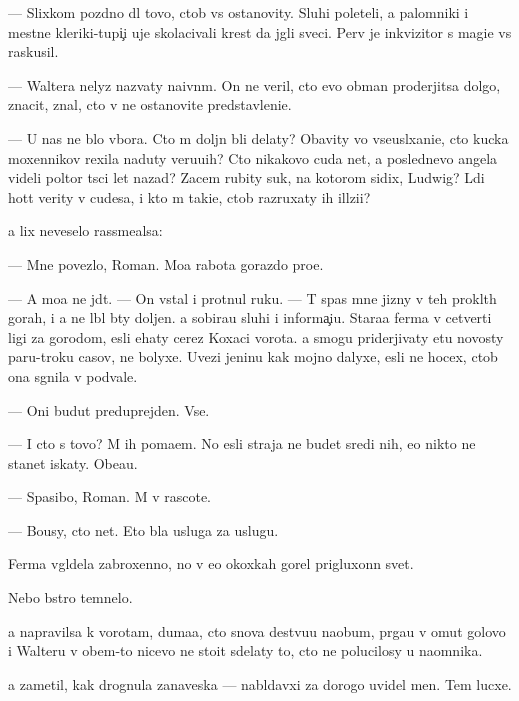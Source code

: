 \documentclass[10pt]{book}
\begin{document}
— Slixkom pozdno dl{\ia} tovo, ctob{\yi} vs{\e} ostanovity. Sluhi poleteli, a palomniki i mestn{\yi}{\y}e kleriki-tupi{\c}i uje skolacivali krest da jgli sveci. Perv{\yi}{\y} je inkvizitor s magi{\y}e{\y} vs{\e} raskusil.

— Waltera nelyz{\ia} nazvaty naivn{\yi}m. On ne veril, cto {\y}evo obman proderjitsa dolgo, znacit, znal, cto v{\yi} ne ostanovite predstavleni{\y}e.

— U nas ne b{\yi}lo v{\yi}bora. Cto m{\yi} doljn{\yi} b{\yi}li delaty? Ob{\y}avity vo vse\-usl{\yi}\-xa\-ni\-{\y}e, cto kucka moxennikov rexila naduty veru{\y}u{\x}ih? Cto nikakovo cuda net, a poslednevo angela videli poltor{\yi} t{\yi}s{\ia}ci let nazad? Zacem rubity suk, na kotorom sidix, Ludwig? L{\io}di hot{\ia}t verity v cudesa, i kto m{\yi} taki{\y}e, ctob{\yi} razruxaty ih ill{\io}zi{\y}i?

{\Y}a lix neveselo rassme{\y}alsa:

— Mne povezlo, Roman. Mo{\y}a rabota gorazdo pro{\x}e.

— A mo{\y}a ne jd{\e}t. — On vstal i pro\-t{\ia}\-nul ruku. — T{\yi} spas mne jizny v teh pro\-kl{\ia}\-t{\yi}h gorah, i {\y}a ne l{\io}bl{\io} b{\yi}ty doljen. {\Y}a sobira{\y}u sluhi i informa{\c}i{\y}u. Stara{\y}a ferma v cetverti ligi za gorodom, {\y}esli {\y}ehaty cerez Koxac{\y}i vorota. {\Y}a smogu priderjivaty etu novosty paru-tro{\y}ku casov, ne bolyxe. Uvezi jen{\x}inu kak mojno dalyxe, {\y}esli ne hocex, ctob{\yi} ona sgnila v podvale.

— Oni budut preduprejden{\yi}. Vse.

— I cto s tovo? M{\yi} ih po{\y}ma{\y}em. No {\y}esli straja ne budet sredi nih, {\y}e{\y}o nikto ne stanet iskaty. Obe{\x}a{\y}u.

— Spasibo, Roman. M{\yi} v rascote.

— Bo{\y}usy, cto net. Eto b{\yi}la usluga za uslugu.



Ferma v{\yi}gl{\ia}dela zabroxenno{\y}, no v {\y}e{\y}o okoxkah gorel prigluxonn{\yi}{\y} svet.

Nebo b{\yi}stro temnelo.

{\Y}a napravilsa k vorotam, duma{\y}a, cto snova de{\y}stvu{\y}u naobum, pr{\yi}ga{\y}u v omut go\-lo\-vo{\y} i Walteru v ob{\x}em-to nicevo ne stoit sdelaty to, cto ne polucilosy u na\-{\y}om\-ni\-ka.

{\Y}a zametil, kak drognula zanaveska — nabl{\io}davxi{\y} za dorogo{\y} uvidel men{\ia}. Tem lucxe.
\end{document}

